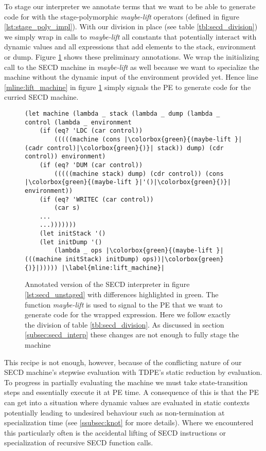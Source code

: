 \documentclass[a4paper,12pt,twoside,openright]{report}
\theoremstyle{definition}
\begin{document}
To stage our interpreter we annotate terms that we want to be able to generate code for with the stage-polymorphic \textit{maybe-lift} operators (defined in figure \ref{lst:stage_poly_impl}). With our division in place (see table \ref{tbl:secd_division}) we simply wrap in calls to \textit{maybe-lift} all constants that potentially interact with dynamic values and all expressions that add elements to the stack, environment or dump. Figure \ref{lst:secd_staged1} shows these preliminary annotations. We wrap the initializing call to the SECD machine in \textit{maybe-lift} as well because we want to specialize the machine without the dynamic input of the environment provided yet. Hence line \ref{mline:lift_machine} in figure \ref{lst:secd_staged1} simply signals the PE to generate code for the curried SECD machine.

\begin{figure}[ht]
\centering
\begin{verbatim}
(let machine (lambda _ stack (lambda _ dump (lambda _ control (lambda _ environment
    (if (eq? 'LDC (car control))
        (((((machine (cons |\colorbox{green}{(maybe-lift }|(cadr control)|\colorbox{green}{)}| stack)) dump) (cdr control)) environment)
    (if (eq? 'DUM (car control))
        (((((machine stack) dump) (cdr control)) (cons |\colorbox{green}{(maybe-lift }|'()|\colorbox{green}{)}| environment))
    (if (eq? 'WRITEC (car control))
        (car s)
    ...
    ...)))))))
    (let initStack '()
    (let initDump '()
        (lambda _ ops |\colorbox{green}{(maybe-lift }|(((machine initStack) initDump) ops))|\colorbox{green}{)}|))))) |\label{mline:lift_machine}|
\end{verbatim}
\caption{Annotated version of the SECD interpreter in figure \ref{lst:secd_unstaged} with differences highlighted in green. The function \textit{maybe-lift} is used to signal to the PE that we want to generate code for the wrapped expression. Here we follow exactly the division of table \ref{tbl:secd_division}. As discussed in section \ref{subsec:secd_interp} these changes are not enough to fully stage the machine}
\label{lst:secd_staged1}
\end{figure}

This recipe is not enough, however, because of the conflicting nature of our SECD machine's stepwise evaluation with TDPE's static reduction by evaluation. To progress in partially evaluating the machine we must take state-transition steps and essentially execute it at PE time. A consequence of this is that the PE can get into a situation where dynamic values are evaluated in static contexts potentially leading to undesired behaviour such as non-termination at specialization time (see \ref{ssubsec:knot} for more details). Where we encountered this particularly often is the accidental lifting of SECD instructions or specialization of recursive SECD function calls.
\end{document}
